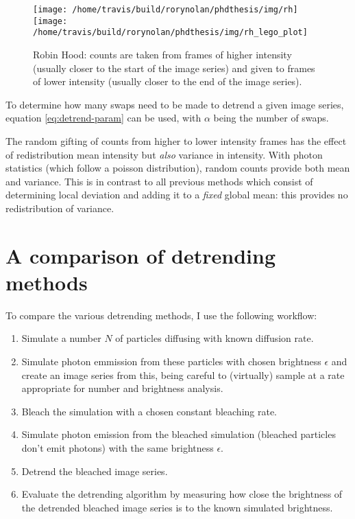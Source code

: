 \documentclass[12pt,]{book}
\providecommand{\tightlist}{%
  \setlength{\itemsep}{0pt}\setlength{\parskip}{0pt}}
\theoremstyle{definition}
\theoremstyle{definition}
\theoremstyle{definition}
\theoremstyle{remark}
\begin{document}
\begin{figure}

\texttt{[image: /home/travis/build/rorynolan/phdthesis/img/rh]} \texttt{[image: /home/travis/build/rorynolan/phdthesis/img/rh\_lego\_plot]} \hfill{}

\caption{Robin Hood: counts are taken from frames of higher
intensity (usually closer to the start of the image series) and given to
frames of lower intensity (usually closer to the end of the image
series).}\label{fig:rh-lego}
\end{figure}

To determine how many swaps need to be made to detrend a given image
series, equation \eqref{eq:detrend-param} can be used, with \(\alpha\)
being the number of swaps.

The random gifting of counts from higher to lower intensity frames has
the effect of redistribution mean intensity but \emph{also} variance in
intensity. With photon statistics (which follow a poisson distribution),
random counts provide both mean and variance. This is in contrast to all
previous methods which consist of determining local deviation and adding
it to a \emph{fixed} global mean: this provides no redistribution of
variance.

\section{A comparison of detrending
methods}\label{a-comparison-of-detrending-methods}

To compare the various detrending methods, I use the following workflow:

\begin{enumerate}
\def\labelenumi{\arabic{enumi}.}
\tightlist
\item
  Simulate a number \(N\) of particles diffusing with known diffusion
  rate.
\item
  Simulate photon emmission from these particles with chosen brightness
  \(\epsilon\) and create an image series from this, being careful to
  (virtually) sample at a rate appropriate for number and brightness
  analysis.
\item
  Bleach the simulation with a chosen constant bleaching rate.
\item
  Simulate photon emission from the bleached simulation (bleached
  particles don't emit photons) with the same brightness \(\epsilon\).
\item
  Detrend the bleached image series.
\item
  Evaluate the detrending algorithm by measuring how close the
  brightness of the detrended bleached image series is to the known
  simulated brightness.
\end{enumerate}
\end{document}
